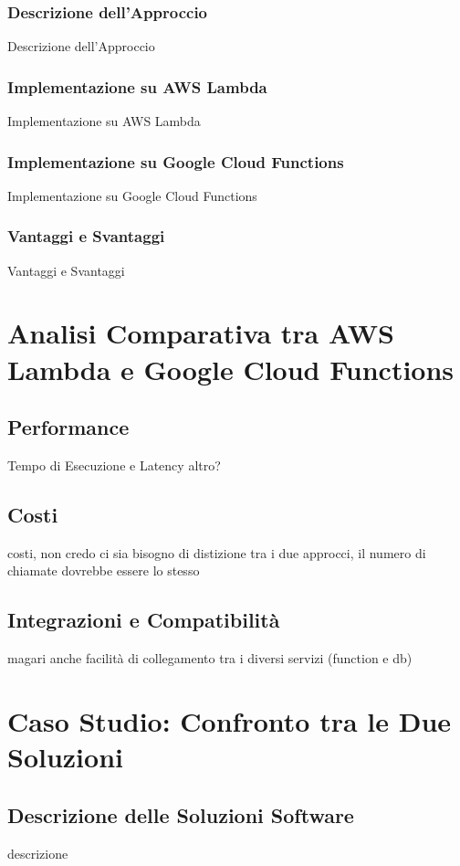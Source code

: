 \documentclass[12pt,a4paper,twoside]{book}
\begin{document}
\subsection{Descrizione dell’Approccio}
Descrizione dell’Approccio

\subsection{Implementazione su AWS Lambda}
Implementazione su AWS Lambda

\subsection{Implementazione su Google Cloud Functions}
Implementazione su Google Cloud Functions

\subsection{Vantaggi e Svantaggi}
Vantaggi e Svantaggi

\chapter{Analisi Comparativa tra AWS Lambda e Google Cloud Functions}
\section{Performance}
Tempo di Esecuzione e Latency
altro?

\section{Costi}
costi, non credo ci sia bisogno di distizione tra i due approcci, il numero di chiamate dovrebbe essere lo stesso

\section{Integrazioni e Compatibilità}
magari anche facilità di collegamento tra i diversi servizi (function e db)

\chapter{Caso Studio: Confronto tra le Due Soluzioni}
\section{Descrizione delle Soluzioni Software}
descrizione
\end{document}
